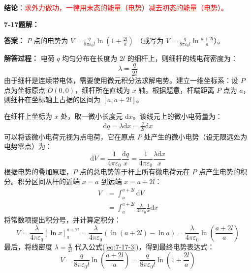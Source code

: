 \textbf{结论}：\textcolor{red}{求外力做功，一律用末态的能量（电势）减去初态的能量（电势）。}

\vspace{2em}

\textbf{7-17题解： }
\setcounter{equation}{0}
\renewcommand{\theHequation}{7-17.\arabic{equation}}

\textbf{答案： }
$P$ 点的电势为 $V = \frac{q}{8\pi\varepsilon_0 l} \ln\left(1 + \frac{2l}{a}\right)$ （或写为 $V = \frac{q}{8\pi\varepsilon_0 l} \ln\frac{a+2l}{a}$）。

\textbf{解答过程： }
电荷 $q$ 均匀分布在长度为 $2l$ 的细杆上，则细杆的线电荷密度为：
\begin{equation}\label{eq:7-17-1}
	\lambda = \frac{q}{2l}
\end{equation}
由于细杆是连续带电体，需要使用微元积分法求解电势。建立一维坐标系：设 $P$ 点为坐标原点 $O(0,0)$，细杆所在直线为 $x$ 轴。根据题意，杆端距离 $P$ 点为 $a$，则细杆在坐标轴上占据的区间为 $[a, a+2l]$。

在细杆上坐标为 $x$ 处，取一微小长度元 $\mathrm{d}x$。该线元上的微小电荷量为：
\begin{align*}
	\mathrm{d}q = \lambda \mathrm{d}x = \frac{q}{2l} \mathrm{d}x
\end{align*}
可以将该微小电荷元视为点电荷，它在原点 $P$ 处产生的微小电势（设无限远处为电势零点）为：
\begin{equation}\label{eq:7-17-2}
	\mathrm{d}V = \frac{1}{4\pi\varepsilon_0} \frac{\mathrm{d}q}{x} = \frac{1}{4\pi\varepsilon_0} \frac{\lambda \mathrm{d}x}{x}
\end{equation}
根据电势的叠加原理，$P$ 点的总电势等于杆上所有微电荷元在 $P$ 点产生电势的积分。积分区间从杆的近端 $x=a$ 到远端 $x=a+2l$：
\begin{align*}
	V &= \int_{a}^{a+2l} \mathrm{d}V \\
	&= \int_{a}^{a+2l} \frac{\lambda}{4\pi\varepsilon_0} \frac{1}{x} \mathrm{d}x
\end{align*}
将常数项提出积分号，并计算定积分：
\begin{equation}\label{eq:7-17-3}
	V = \frac{\lambda}{4\pi\varepsilon_0} \left[ \ln x \right]_{a}^{a+2l} = \frac{\lambda}{4\pi\varepsilon_0} (\ln(a+2l) - \ln a) = \frac{\lambda}{4\pi\varepsilon_0} \ln\left(\frac{a+2l}{a}\right)
\end{equation}
最后，将线密度 $\lambda = \frac{q}{2l}$ 代入公式(\ref{eq:7-17-3})，得到最终电势表达式：
\begin{equation}\label{eq:7-17-4}
	V = \frac{q}{8\pi\varepsilon_0 l} \ln\left(\frac{a+2l}{a}\right) = \frac{q}{8\pi\varepsilon_0 l} \ln\left(1 + \frac{2l}{a}\right)
\end{equation}

